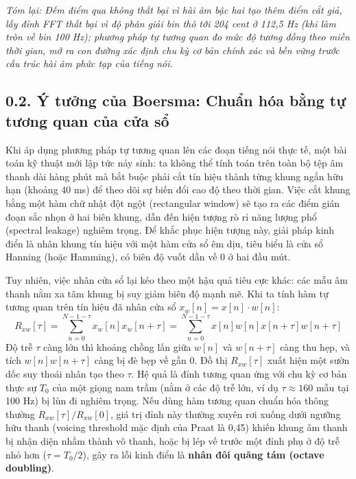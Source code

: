 \textit{Tóm lại: Đếm điểm qua không thất bại vì hài âm bậc hai tạo thêm điểm cắt giả, lấy đỉnh FFT thất bại vì độ phân giải bin thô tới 204 cent ở 112,5 Hz (khi làm tròn về bin 100 Hz); phương pháp tự tương quan đo mức độ tương đồng theo miền thời gian, mở ra con đường xác định chu kỳ cơ bản chính xác và bền vững trước cấu trúc hài âm phức tạp của tiếng nói.}

\subsection*{0.2. Ý tưởng của Boersma: Chuẩn hóa bằng tự tương quan của cửa sổ}

Khi áp dụng phương pháp tự tương quan lên các đoạn tiếng nói thực tế, một bài toán kỹ thuật mới lập tức nảy sinh: ta không thể tính toán trên toàn bộ tệp âm thanh dài hàng phút mà bắt buộc phải cắt tín hiệu thành từng khung ngắn hữu hạn (khoảng 40 ms) để theo dõi sự biến đổi cao độ theo thời gian. Việc cắt khung bằng một hàm chữ nhật đột ngột (rectangular window) sẽ tạo ra các điểm gián đoạn sắc nhọn ở hai biên khung, dẫn đến hiện tượng rò rỉ năng lượng phổ (spectral leakage) nghiêm trọng. Để khắc phục hiện tượng này, giải pháp kinh điển là nhân khung tín hiệu với một hàm cửa sổ êm dịu, tiêu biểu là cửa sổ Hanning (hoặc Hamming), có biên độ vuốt dần về 0 ở hai đầu mút.

Tuy nhiên, việc nhân cửa sổ lại kéo theo một hậu quả tiêu cực khác: các mẫu âm thanh nằm xa tâm khung bị suy giảm biên độ mạnh mẽ. Khi ta tính hàm tự tương quan trên tín hiệu đã nhân cửa sổ $x_w[n] = x[n] \cdot w[n]$:
\begin{equation}
R_{xw}[\tau] = \sum_{n=0}^{N-1-\tau} x_w[n] x_w[n+\tau] = \sum_{n=0}^{N-1-\tau} x[n] w[n] x[n+\tau] w[n+\tau]
\end{equation}
Độ trễ $\tau$ càng lớn thì khoảng chồng lấn giữa $w[n]$ và $w[n+\tau]$ càng thu hẹp, và tích $w[n] w[n+\tau]$ càng bị đè bẹp về gần 0. Đồ thị $R_{xw}[\tau]$ xuất hiện một sườn dốc suy thoái nhân tạo theo $\tau$. Hệ quả là đỉnh tương quan ứng với chu kỳ cơ bản thực sự $T_0$ của một giọng nam trầm (nằm ở các độ trễ lớn, ví dụ $\tau \approx 160$ mẫu tại 100 Hz) bị lùn đi nghiêm trọng. Nếu dùng hàm tương quan chuẩn hóa thông thường $R_{xw}[\tau]/R_{xw}[0]$, giá trị đỉnh này thường xuyên rơi xuống dưới ngưỡng hữu thanh (voicing threshold mặc định của Praat là 0,45) khiến khung âm thanh bị nhận diện nhầm thành vô thanh, hoặc bị lép vế trước một đỉnh phụ ở độ trễ nhỏ hơn ($\tau = T_0 / 2$), gây ra lỗi kinh điển là \textbf{nhân đôi quãng tám (octave doubling)}.

